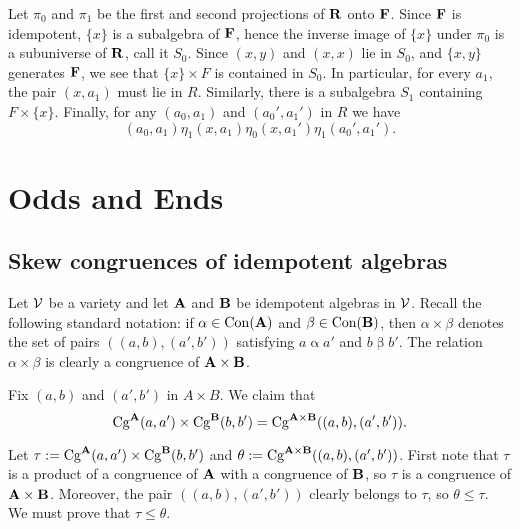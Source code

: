 \begin{remark}
  \label{rem:absorpt-theor-bk}
  Let $\pi_0$ and $\pi_1$ be the first and second projections of $\mathbf{R}$ onto $\mathbf{F}$.
  Since $\mathbf{F}$ is idempotent, $\{x\}$ is a subalgebra of $\mathbf{F}$, hence the inverse
  image of $\{x\}$ under $\pi_0$ is a subuniverse of $\mathbf{R}$, call it $S_0$.
  Since $(x,y)$ and $(x,x)$ lie in $S_0$, and $\{x,y\}$
  generates $\mathbf{F}$, we see that $\{x\}\times F$ is contained in $S_0$.
  In particular, for every $a_1$, the pair $(x,a_1)$ must lie in $R$.
  Similarly, there is a subalgebra $S_1$ containing
  $F\times \{x\}$. %
  Finally, for any $(a_0,a_1)$ and $(a_0',a_1')$ in $R$ we have
  \[
  (a_0,a_1) \mathrel{\eta_1} (x,a_1) \mathrel{\eta_0} (x,a_1') \mathrel{\eta_1} (a_0',a_1').
  \]
\end{remark}

\bigskip

\section{Odds and Ends}

\subsection{Skew congruences of idempotent algebras}
Let $\mathcal{V}$ be a variety and let $\mathbf{A}$ and $\mathbf{B}$ be idempotent
algebras in $\mathcal{V}$.
Recall the following standard notation:
if $\alpha \in \operatorname{Con}(\mathbf{A})$ and $\beta \in \operatorname{Con}(\mathbf{B})$, then
$\alpha \times \beta$ denotes the set of pairs $((a,b),(a',b'))$ satisfying
$a \mathrel{\alpha} a'$ and $b \mathrel{\beta} b'$.  The relation 
$\alpha \times \beta$ is clearly a congruence of $\mathbf{A} \times \mathbf{B}$.

Fix $(a, b)$ and $(a', b')$ in $A \times B$.
We claim that
\[\operatorname{Cg}^{\mathbf{A}}(a,a') \times \operatorname{Cg}^{\mathbf{B}}(b,b')
=\operatorname{Cg}^{\mathbf{A} \times \mathbf{B}}((a, b), (a', b')).\]

Let $\tau := \operatorname{Cg}^{\mathbf{A}}(a,a') \times \operatorname{Cg}^{\mathbf{B}}(b,b')$  %
and $\theta:= \operatorname{Cg}^{\mathbf{A} \times \mathbf{B}}((a, b), (a', b'))$.
First note that $\tau$ is a product of a congruence
of $\mathbf{A}$ with a congruence of $\mathbf{B}$, so $\tau$
is a congruence of $\mathbf{A}\times \mathbf{B}$.
Moreover, the pair $((a,b), (a',b'))$ clearly belongs to $\tau$, so
$\theta\leq \tau$.  We must prove that $\tau \leq \theta$.

